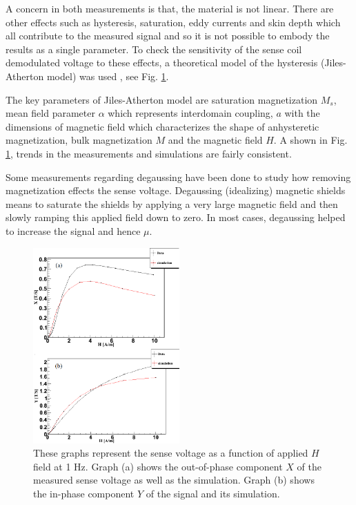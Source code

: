 \documentclass[review]{elsarticle}
\begin{document}
A concern in both measurements is that, the material is not
linear. There are other effects such as hysteresis, saturation, eddy
currents and skin depth which all contribute to the measured signal
and so it is not possible to embody the results as a single parameter.
To check the sensitivity of the sense coil demodulated voltage to
these effects, a theoretical model of the hysteresis (Jiles-Atherton
model) was used \cite{bib:jiles}, see Fig.
\ref{fig:data_and_simulation}.

The key parameters of Jiles-Atherton model are saturation
magnetization $M_s$, mean field parameter $\alpha$ which represents
interdomain coupling, $a$ with the dimensions of magnetic field which
characterizes the shape of anhysteretic magnetization, bulk
magnetization $M$ and the magnetic field $H$. A shown in
Fig. \ref{fig:data_and_simulation}, trends in the measurements and
simulations are fairly consistent.

Some measurements regarding degaussing have been done to study how
removing magnetization effects the sense voltage. Degaussing
(idealizing) magnetic shields means to saturate the shields by
applying a very large magnetic field and then slowly ramping this
applied field down to zero. In most cases, degaussing helped to
increase the signal and hence $\mu$.

\begin{figure}[h!]
\begin{center}
   \includegraphics[width=0.5\textwidth]{data_and_simulation3.PNG}
    \caption{These graphs represent the sense voltage as a function of applied $H$ field at 1 Hz. Graph (a) shows the out-of-phase component $X$ of the measured sense voltage as well as the simulation. Graph (b) shows the in-phase component $Y$ of the signal and its simulation.}
    \label{fig:data_and_simulation}
    \end{center}
\end{figure} 
\end{document}
